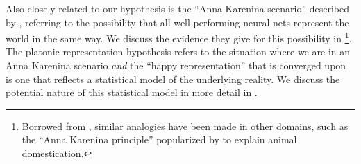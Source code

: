 \documentclass{article}
\newcommand{\tz}[1]{{\color{magenta}TZ: #1}}
\newcommand{\phil}[1]{{\color{orange}PI: #1}}
\theoremstyle{plain}
\theoremstyle{definition}
\theoremstyle{remark}
\begin{document}

Also closely related to our hypothesis is the ``Anna Karenina scenario'' described by \citet{bansal2021revisiting}, referring to the possibility that all well-performing neural nets represent the world in the same way. We discuss the evidence they give for this possibility in \footnote{Borrowed from \citet{tolstoy1877anna}, similar analogies have been made in other domains, such as the ``Anna Karenina principle'' popularized by \citet{diamond1998guns} to explain animal domestication.}. The platonic representation hypothesis refers to the situation where we are in an Anna Karenina scenario \textit{and} the ``happy representation'' that is converged upon is one that reflects a statistical model of the underlying reality. We discuss the potential nature of this statistical model in more detail in .%



\end{document}
